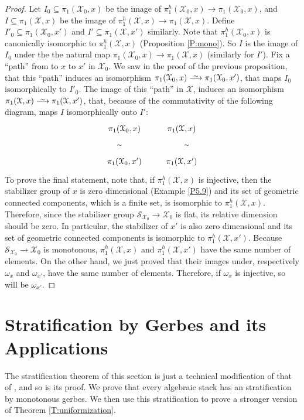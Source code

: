 \documentclass{amsart}
\theoremstyle{definition}
\theoremstyle{remark}
\theoremstyle{remark}
\newcommand{\X}{\mathcal{X}}
\newcommand{\ox}{\omega_x}
\newcommand{\pX}{\pi_1(\X,x)}
\newcommand{\phX}{\pi_1^{h}(\X,x)}
\def\smashedlongrightarrow{\setbox0=\hbox{$\longrightarrow$}\ht0=1pt\box0}
\def\risom{\buildrel\sim\over{\smashedlongrightarrow}}
\begin{document}
\begin{proof}
Let $I_0 \subseteq \pi_1(\X_0,x)$ be the image of $\pi_1^h(\X_0,x)
\to \pi_1(\X_0,x)$, and $I \subseteq \pi_1(\X,x)$ be the image of
$\pi_1^h(\X,x) \to \pi_1(\X,x)$. Define $I'_0 \subseteq
\pi_1(\X_0,x')$ and $I' \subseteq \pi_1(\X,x')$ similarly. Note
that $\pi_1^h(\X_0,x)$ is canonically isomorphic to
$\pi_1^h(\X,x)$ (Proposition \ref{P:mono}). So $I$   is the image
of $I_0$   under the the natural map $\pi_1(\X_0,x) \to \pX$
(similarly for $I'$). Fix a ``path'' from to $x$ to $x'$ in
$\X_0$. We saw in the proof of the previous proposition, that this
``path'' induces an isomorphism $\pi_1(\X_0,x) \risom
\pi_1(\X_0,x')$, that maps $I_0$ isomorphically to $I'_0$. The
image of this ``path'' in $\X$, induces an isomorphism
$\pi_1(\X,x) \risom \pi_1(\X,x')$, that, because of the
commutativity of the following diagram, maps $I$ isomorphically
onto $I'$: $$\xymatrix{\pi_1(\X_0,x)   \ar[r] \ar[d]_{\sim} &
\pi_1(\X,x)  \ar[d]^{\sim} \\
            \pi_1(\X_0,x')  \ar[r]               &  \pi_1(\X,x')}$$
To prove the final statement, note that, if $\pi_1^h(\X,x)$ is
injective, then the stabilizer group of $x$ is zero dimensional
(Example \ref{P5.9}) and its set of geometric connected
components, which is a finite set, is isomorphic to $\phX$.
Therefore, since the stabilizer group $\mathcal{S}_{\X_0} \to
\X_0$  is flat, its relative dimension should be zero. In
particular, the stabilizer of $x'$ is also zero dimensional and
its set of geometric connected components is isomorphic to
$\pi_1^h(\X,x')$. Because $\mathcal{S}_{\X_0} \to \X_0$  is
monotonous, $\phX$ and $\pi_1^h(\X,x')$ have the same number of
elements. On the other hand, we just proved that their images
under, respectively $\ox$ and $\omega_{x'}$, have the same number
of elements. Therefore, if $\ox$ is injective, so will be
$\omega_{x'}$.
\end{proof}

 \section{Stratification by Gerbes and its Applications}{\label{S:strat}}

 The stratification theorem of this section is just a technical
modification of that of \cite{LM}, and so is its proof. We prove
that every algebraic stack has an stratification by monotonous
gerbes. We then use this stratification to prove a stronger
version of Theorem \ref{T:uniformization}.
\end{document}
